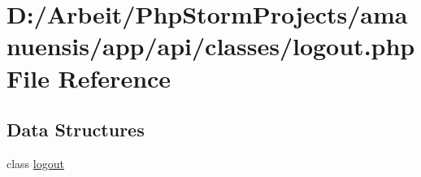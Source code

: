 \hypertarget{a00066}{}\section{D\+:/\+Arbeit/\+Php\+Storm\+Projects/amanuensis/app/api/classes/logout.php File Reference}
\label{a00066}
\subsection*{Data Structures}
\begin{DoxyCompactItemize}
\item 
class \hyperlink{a00030}{logout}
\end{DoxyCompactItemize}
